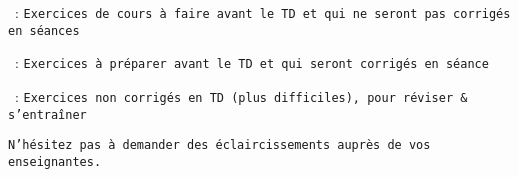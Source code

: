 \begin{tcolorbox}[
        colback=gray!20,
        colframe=gray!20,
        width=\dimexpr\textwidth\relax, 
        arc=0pt,outer arc=0pt,
        ]

\soft~: \texttt{Exercices de cours à faire avant le TD et qui ne seront pas corrigés en séances}

\medium~: \texttt{Exercices à préparer avant le TD et qui seront corrigés en séance}

\hard~: \texttt{Exercices non corrigés en TD (plus difficiles), pour réviser \& s'entraîner}

\vspace{0.2cm}

\texttt{N'hésitez pas à demander des éclaircissements auprès de vos enseignant\textperiodcentered e\textperiodcentered s.}

\end{tcolorbox}